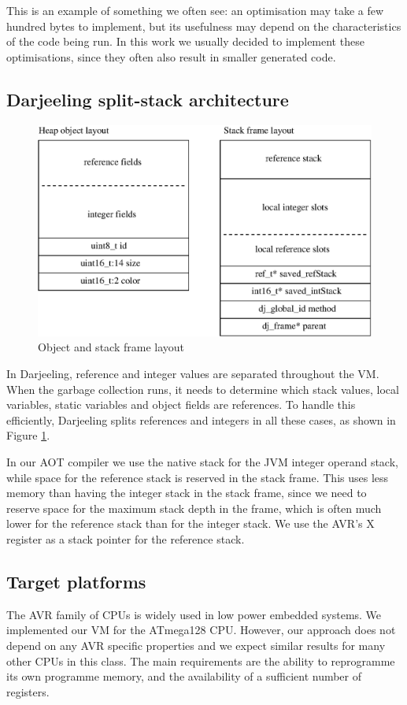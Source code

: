 This is an example of something we often see: an optimisation may take a few hundred bytes to implement, but its usefulness may depend on the characteristics of the code being run. In this work we usually decided to implement these optimisations, since they often also result in smaller generated code.

\subsection{Darjeeling split-stack architecture}
\label{sec-darjeeling-split-architecure}
\begin{figure}[]
  \includegraphics[width=0.5\linewidth]{object-and-stack-frame-layout.eps}
  \caption{Object and stack frame layout}
  \label{fig-object-and-stack-frame-layout}
\end{figure}

In Darjeeling, reference and integer values are separated throughout the VM. When the garbage collection runs, it needs to determine which stack values, local variables, static variables and object fields are references. To handle this efficiently, Darjeeling splits references and integers in all these cases, as shown in Figure \ref{fig-object-and-stack-frame-layout}.

In our AOT compiler we use the native stack for the JVM integer operand stack, while space for the reference stack is reserved in the stack frame. This uses less memory than having the integer stack in the stack frame, since we need to reserve space for the maximum stack depth in the frame, which is often much lower for the reference stack than for the integer stack. We use the AVR's X register as a stack pointer for the reference stack.

\subsection{Target platforms}
The AVR family of CPUs is widely used in low power embedded systems. We implemented our VM for the ATmega128 CPU. However, our approach does not depend on any AVR specific properties and we expect similar results for many other CPUs in this class. The main requirements are the ability to reprogramme its own programme memory, and the availability of a sufficient number of registers.

